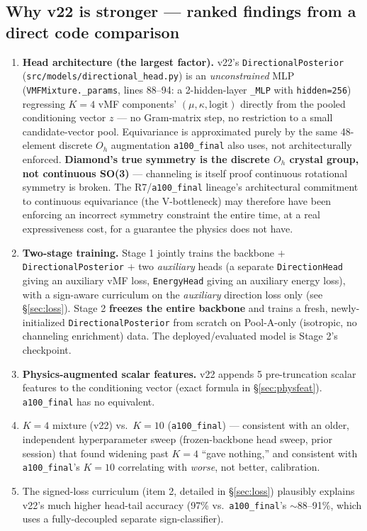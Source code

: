 \documentclass[11pt]{article}
\newcommand{\code}[1]{\texttt{#1}}
\begin{document}
\subsection{Why v22 is stronger --- ranked findings from a direct code comparison}
\begin{enumerate}[leftmargin=*]
\item \textbf{Head architecture (the largest factor).} v22's \code{DirectionalPosterior}
      (\code{src/models/directional\_head.py}) is an \emph{unconstrained} MLP
      (\code{VMFMixture.\_params}, lines 88--94: a 2-hidden-layer \code{\_MLP} with
      \code{hidden=256}) regressing $K{=}4$ vMF components' $(\mu,\kappa,\text{logit})$
      directly from the pooled conditioning vector $z$ --- no Gram-matrix step, no
      restriction to a small candidate-vector pool. Equivariance is approximated purely by
      the same 48-element discrete $O_h$ augmentation \code{a100\_final} also uses, not
      architecturally enforced. \textbf{Diamond's true symmetry is the discrete $O_h$
      crystal group, not continuous SO(3)} --- channeling is itself proof continuous
      rotational symmetry is broken. The R7/\code{a100\_final} lineage's architectural
      commitment to continuous equivariance (the V-bottleneck) may therefore have been
      enforcing an incorrect symmetry constraint the entire time, at a real expressiveness
      cost, for a guarantee the physics does not have.
\item \textbf{Two-stage training.} Stage 1 jointly trains the backbone $+$
      \code{DirectionalPosterior} $+$ two \emph{auxiliary} heads (a separate
      \code{DirectionHead} giving an auxiliary vMF loss, \code{EnergyHead} giving an
      auxiliary energy loss), with a sign-aware curriculum on the \emph{auxiliary} direction
      loss only (see \S\ref{sec:loss}). Stage 2 \textbf{freezes the entire backbone} and
      trains a fresh, newly-initialized \code{DirectionalPosterior} from scratch on
      Pool-A-only (isotropic, no channeling enrichment) data. The deployed/evaluated model is
      Stage 2's checkpoint.
\item \textbf{Physics-augmented scalar features.} v22 appends 5 pre-truncation scalar
      features to the conditioning vector (exact formula in \S\ref{sec:physfeat}).
      \code{a100\_final} has no equivalent.
\item $K{=}4$ mixture (v22) vs.\ $K{=}10$ (\code{a100\_final}) --- consistent with an older,
      independent hyperparameter sweep (frozen-backbone head sweep, prior session) that found
      widening past $K{=}4$ ``gave nothing,'' and consistent with \code{a100\_final}'s $K{=}10$
      correlating with \emph{worse}, not better, calibration.
\item The signed-loss curriculum (item 2, detailed in \S\ref{sec:loss}) plausibly explains
      v22's much higher head-tail accuracy (97\% vs.\ \code{a100\_final}'s $\sim$88--91\%,
      which uses a fully-decoupled separate sign-classifier).
\end{enumerate}
\end{document}
